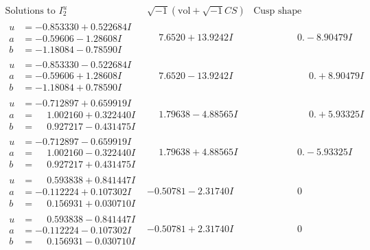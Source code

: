 \documentclass[1p]{elsarticle_modified}
\theoremstyle{definition}
\newcommand{\I}{\sqrt{-1}}
\begin{document}
$$\begin{array}{c|c|c}  
\text{Solutions to }I^u_{2}& \I (\text{vol} + \sqrt{-1}CS) & \text{Cusp shape}\\
 \hline 
\begin{aligned}
u &= -0.853330 + 0.522684 I \\
a &= -0.59606 - 1.28608 I \\
b &= -1.18084 - 0.78590 I\end{aligned}
 & \phantom{-}7.6520 + 13.9242 I & \phantom{-0.000000 } 0. - 8.90479 I \\ \hline\begin{aligned}
u &= -0.853330 - 0.522684 I \\
a &= -0.59606 + 1.28608 I \\
b &= -1.18084 + 0.78590 I\end{aligned}
 & \phantom{-}7.6520 - 13.9242 I & \phantom{-0.000000 -}0. + 8.90479 I \\ \hline\begin{aligned}
u &= -0.712897 + 0.659919 I \\
a &= \phantom{-}1.002160 + 0.322440 I \\
b &= \phantom{-}0.927217 - 0.431475 I\end{aligned}
 & \phantom{-}1.79638 - 4.88565 I & \phantom{-0.000000 -}0. + 5.93325 I \\ \hline\begin{aligned}
u &= -0.712897 - 0.659919 I \\
a &= \phantom{-}1.002160 - 0.322440 I \\
b &= \phantom{-}0.927217 + 0.431475 I\end{aligned}
 & \phantom{-}1.79638 + 4.88565 I & \phantom{-0.000000 } 0. - 5.93325 I \\ \hline\begin{aligned}
u &= \phantom{-}0.593838 + 0.841447 I \\
a &= -0.112224 + 0.107302 I \\
b &= \phantom{-}0.156931 + 0.030710 I\end{aligned}
 & -0.50781 - 2.31740 I & \phantom{-0.000000 } 0 \\ \hline\begin{aligned}
u &= \phantom{-}0.593838 - 0.841447 I \\
a &= -0.112224 - 0.107302 I \\
b &= \phantom{-}0.156931 - 0.030710 I\end{aligned}
 & -0.50781 + 2.31740 I & \phantom{-0.000000 } 0 \\ \hline\begin{aligned}

\end{aligned}
\end{array}$$
\end{document}

